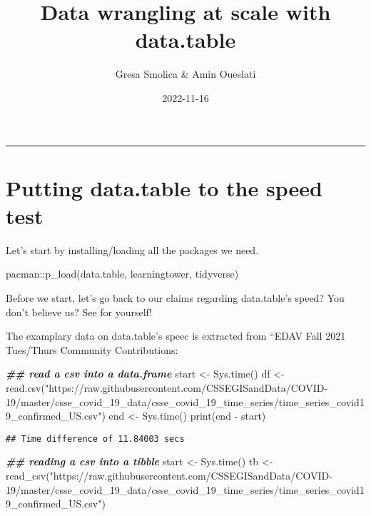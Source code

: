 \documentclass[
]{article}
\title{Data wrangling at scale with data.table}
\author{Gresa Smolica \& Amin Oueslati}
\date{2022-11-16}
\newenvironment{Shaded}{\begin{snugshade}}{\end{snugshade}}
\newcommand{\DocumentationTok}[1]{\textcolor[rgb]{0.56,0.35,0.01}{\textbf{\textit{#1}}}}
\newcommand{\FunctionTok}[1]{\textcolor[rgb]{0.00,0.00,0.00}{#1}}
\newcommand{\NormalTok}[1]{#1}
\newcommand{\OtherTok}[1]{\textcolor[rgb]{0.56,0.35,0.01}{#1}}
\newcommand{\SpecialCharTok}[1]{\textcolor[rgb]{0.00,0.00,0.00}{#1}}
\newcommand{\StringTok}[1]{\textcolor[rgb]{0.31,0.60,0.02}{#1}}
\begin{document}
\maketitle

{
\setcounter{tocdepth}{3}
\tableofcontents
}
\begin{center}\rule{0.5\linewidth}{0.5pt}\end{center}

\hypertarget{putting-data.table-to-the-speed-test}{%
\section{Putting data.table to the speed
test}\label{putting-data.table-to-the-speed-test}}

Let's start by installing/loading all the packages we need.

\begin{Shaded}
\begin{Highlighting}[]
\NormalTok{pacman}\SpecialCharTok{::}\FunctionTok{p\_load}\NormalTok{(data.table, learningtower, tidyverse)}
\end{Highlighting}
\end{Shaded}

Before we start, let's go back to our claims regarding data.table's
speed? You don't believe us? See for yourself!

The examplary data on data.table's speec is extracted from ``EDAV Fall
2021 Tues/Thurs Community Contributions:

\begin{Shaded}
\begin{Highlighting}[]
\DocumentationTok{\#\# read a csv into a data.frame}
\NormalTok{start }\OtherTok{\textless{}{-}} \FunctionTok{Sys.time}\NormalTok{()}
\NormalTok{df }\OtherTok{\textless{}{-}} \FunctionTok{read.csv}\NormalTok{(}\StringTok{"https://raw.githubusercontent.com/CSSEGISandData/COVID{-}19/master/csse\_covid\_19\_data/csse\_covid\_19\_time\_series/time\_series\_covid19\_confirmed\_US.csv"}\NormalTok{)}
\NormalTok{end }\OtherTok{\textless{}{-}} \FunctionTok{Sys.time}\NormalTok{()}
\FunctionTok{print}\NormalTok{(end }\SpecialCharTok{{-}}\NormalTok{ start)}
\end{Highlighting}
\end{Shaded}

\begin{verbatim}
## Time difference of 11.84003 secs
\end{verbatim}

\begin{Shaded}
\begin{Highlighting}[]
\DocumentationTok{\#\# reading a csv into a tibble}
\NormalTok{start }\OtherTok{\textless{}{-}} \FunctionTok{Sys.time}\NormalTok{()}
\NormalTok{tb }\OtherTok{\textless{}{-}} \FunctionTok{read\_csv}\NormalTok{(}\StringTok{"https://raw.githubusercontent.com/CSSEGISandData/COVID{-}19/master/csse\_covid\_19\_data/csse\_covid\_19\_time\_series/time\_series\_covid19\_confirmed\_US.csv"}\NormalTok{)}
\end{Highlighting}
\end{Shaded}
\end{document}
